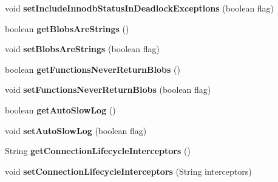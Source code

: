 \begin{DoxyCompactItemize}
void {\bfseries set\+Include\+Innodb\+Status\+In\+Deadlock\+Exceptions} (boolean flag)
\item 
\mbox{\label{classcom_1_1mysql_1_1jdbc_1_1_connection_properties_impl_a386d8f6ff9676de6db18d0d41baf4f1f}} 
boolean {\bfseries get\+Blobs\+Are\+Strings} ()
\item 
\mbox{\label{classcom_1_1mysql_1_1jdbc_1_1_connection_properties_impl_aa759dca555a0e8e755d542ca29fcc3e6}} 
void {\bfseries set\+Blobs\+Are\+Strings} (boolean flag)
\item 
\mbox{\label{classcom_1_1mysql_1_1jdbc_1_1_connection_properties_impl_ad4950ffd26a6ea78d4b43e572295f0c1}} 
boolean {\bfseries get\+Functions\+Never\+Return\+Blobs} ()
\item 
\mbox{\label{classcom_1_1mysql_1_1jdbc_1_1_connection_properties_impl_a32d73085fd177b2b3e26eaa996920381}} 
void {\bfseries set\+Functions\+Never\+Return\+Blobs} (boolean flag)
\item 
\mbox{\label{classcom_1_1mysql_1_1jdbc_1_1_connection_properties_impl_a661d958817bc83d96fe89fce3018ff15}} 
boolean {\bfseries get\+Auto\+Slow\+Log} ()
\item 
\mbox{\label{classcom_1_1mysql_1_1jdbc_1_1_connection_properties_impl_aa86e4269d45eac8e7fe2751d4cea4554}} 
void {\bfseries set\+Auto\+Slow\+Log} (boolean flag)
\item 
\mbox{\label{classcom_1_1mysql_1_1jdbc_1_1_connection_properties_impl_a7095432f067eea5cdb0ffe6bd8511548}} 
String {\bfseries get\+Connection\+Lifecycle\+Interceptors} ()
\item 
\mbox{\label{classcom_1_1mysql_1_1jdbc_1_1_connection_properties_impl_a0cc9f443186dcf3014b51e7d1794a323}} 
void {\bfseries set\+Connection\+Lifecycle\+Interceptors} (String interceptors)

\end{DoxyCompactItemize}
